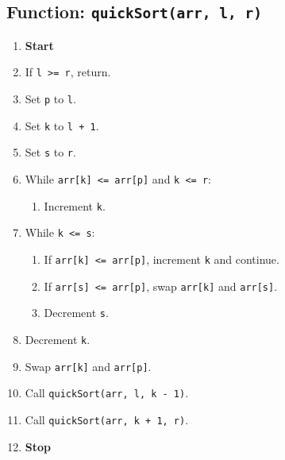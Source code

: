 {  \subsection{Function: \texttt{quickSort(arr, l, r)}}
  \begin{enumerate}[label*=\arabic*.]
    \item \textbf{Start}
    \item If \texttt{l >= r}, return.
    \item Set \texttt{p} to \texttt{l}.
    \item Set \texttt{k} to \texttt{l + 1}.
    \item Set \texttt{s} to \texttt{r}.
    \item While \texttt{arr[k] <= arr[p]} and \texttt{k <= r}:
          \begin{enumerate}[label*=\arabic*.]
            \item Increment \texttt{k}.
          \end{enumerate}
    \item While \texttt{k <= s}:
          \begin{enumerate}[label*=\arabic*.]
            \item If \texttt{arr[k] <= arr[p]}, increment \texttt{k} and continue.
            \item If \texttt{arr[s] <= arr[p]}, swap \texttt{arr[k]} and \texttt{arr[s]}.
            \item Decrement \texttt{s}.
          \end{enumerate}
    \item Decrement \texttt{k}.
    \item Swap \texttt{arr[k]} and \texttt{arr[p]}.
    \item Call \texttt{quickSort(arr, l, k - 1)}.
    \item Call \texttt{quickSort(arr, k + 1, r)}.
    \item \textbf{Stop}
  \end{enumerate}

}
